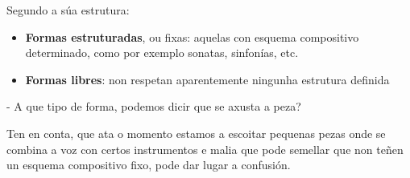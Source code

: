 \begin{enumerate}[1.-]
\begin{enumerate}[a)]
                Segundo a súa estrutura:
                \begin{itemize}
                    \item 
                    \textbf{Formas estruturadas}, ou fixas: aquelas con esquema compositivo determinado, como por exemplo sonatas, sinfonías, etc.
                    \item
                    \textbf{Formas libres}: non respetan aparentemente ningunha estrutura definida
                \end{itemize}
            \end{enumerate}
        \par %
        - A que tipo de forma, podemos dicir que se axusta a peza? \dotfill
        \par %
        Ten en conta, que ata o momento estamos a escoitar pequenas pezas onde se combina a voz con certos instrumentos e malia que pode semellar que non teñen un esquema compositivo fixo, pode dar lugar a confusión.    
        \end{enumerate}
%
